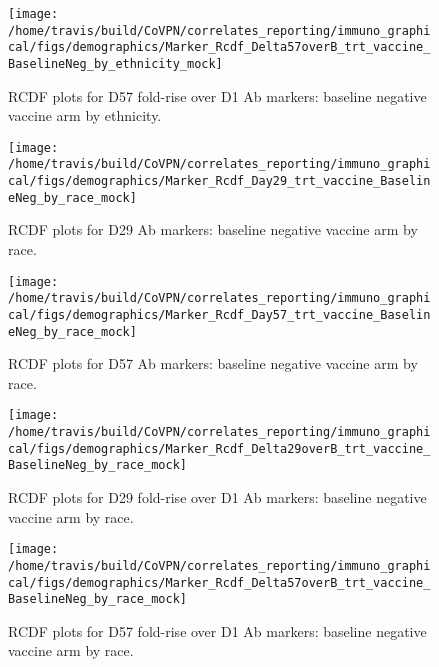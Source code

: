 \documentclass[]{book}
\theoremstyle{definition}
\theoremstyle{definition}
\theoremstyle{definition}
\newcommand{\1}{\mathbbm{1}}
\begin{document}
\begin{figure}[H]

{\centering \texttt{[image: /home/travis/build/CoVPN/correlates\_reporting/immuno\_graphical/figs/demographics/Marker\_Rcdf\_Delta57overB\_trt\_vaccine\_BaselineNeg\_by\_ethnicity\_mock]} 

}

\caption{RCDF plots for D57 fold-rise over D1 Ab markers: baseline negative vaccine arm by ethnicity.}\label{fig:unnamed-chunk-79}
\end{figure}

\begin{figure}[H]

{\centering \texttt{[image: /home/travis/build/CoVPN/correlates\_reporting/immuno\_graphical/figs/demographics/Marker\_Rcdf\_Day29\_trt\_vaccine\_BaselineNeg\_by\_race\_mock]} 

}

\caption{RCDF plots for D29 Ab markers: baseline negative vaccine arm by race.}\label{fig:unnamed-chunk-80}
\end{figure}

\begin{figure}[H]

{\centering \texttt{[image: /home/travis/build/CoVPN/correlates\_reporting/immuno\_graphical/figs/demographics/Marker\_Rcdf\_Day57\_trt\_vaccine\_BaselineNeg\_by\_race\_mock]} 

}

\caption{RCDF plots for D57 Ab markers: baseline negative vaccine arm by race.}\label{fig:unnamed-chunk-81}
\end{figure}

\begin{figure}[H]

{\centering \texttt{[image: /home/travis/build/CoVPN/correlates\_reporting/immuno\_graphical/figs/demographics/Marker\_Rcdf\_Delta29overB\_trt\_vaccine\_BaselineNeg\_by\_race\_mock]} 

}

\caption{RCDF plots for D29 fold-rise over D1 Ab markers: baseline negative vaccine arm by race.}\label{fig:unnamed-chunk-82}
\end{figure}

\begin{figure}[H]

{\centering \texttt{[image: /home/travis/build/CoVPN/correlates\_reporting/immuno\_graphical/figs/demographics/Marker\_Rcdf\_Delta57overB\_trt\_vaccine\_BaselineNeg\_by\_race\_mock]} 

}

\caption{RCDF plots for D57 fold-rise over D1 Ab markers: baseline negative vaccine arm by race.}\label{fig:unnamed-chunk-83}
\end{figure}
\end{document}
